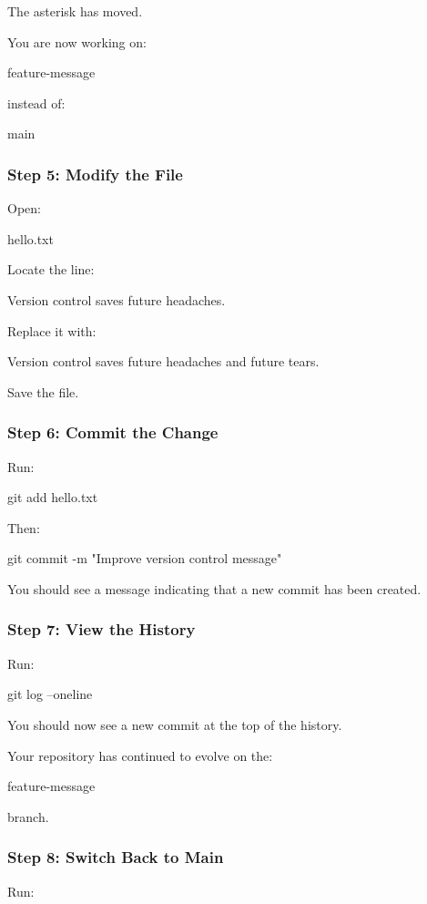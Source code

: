 \documentclass{csc2059practical}
\begin{document}
The asterisk has moved.

You are now working on:

feature-message

instead of:

main

\subsubsection{Step 5: Modify the File}
Open:

\begin{terminalplain}
hello.txt
\end{terminalplain}
Locate the line:

\begin{terminalplain}
Version control saves future headaches.
\end{terminalplain}
Replace it with:

\begin{terminalplain}
Version control saves future headaches and future tears.
\end{terminalplain}
Save the file.

\subsubsection{Step 6: Commit the Change}
Run:

\begin{terminalplain}
git add hello.txt
\end{terminalplain}
Then:

\begin{terminalplain}
git commit -m "Improve version control message"
\end{terminalplain}
You should see a message indicating that a new commit has been created.

\subsubsection{Step 7: View the History}
Run:

\begin{terminalplain}
git log --oneline
\end{terminalplain}
You should now see a new commit at the top of the history.

Your repository has continued to evolve on the:

feature-message

branch.

\subsubsection{Step 8: Switch Back to Main}
Run:
\end{document}

